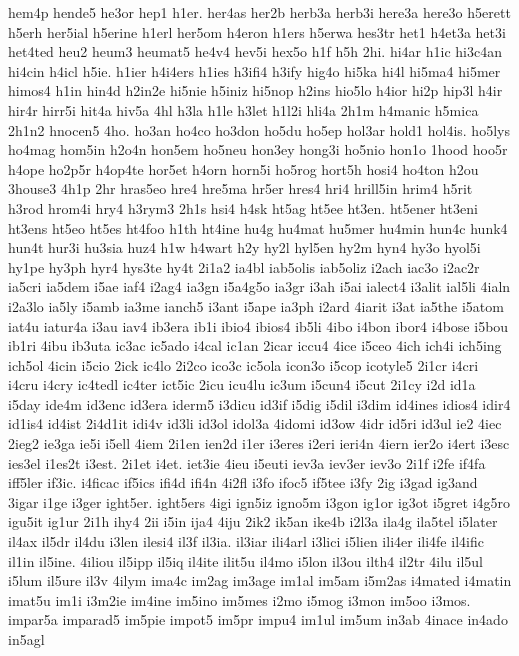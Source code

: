 {hem4p
hende5
he3or
hep1
h1er.
her4as
her2b
herb3a
herb3i
here3a
here3o
h5erett
h5erh
her5ial
h5erine
h1erl
her5om
h4eron
h1ers
h5erwa
hes3tr
het1
h4et3a
het3i
het4ted
heu2
heum3
heumat5
he4v4
hev5i
hex5o
h1f
h5h
2hi.
hi4ar
h1ic
hi3c4an
hi4cin
h4icl
h5ie.
h1ier
h4i4ers
h1ies
h3ifi4
h3ify
hig4o
hi5ka
hi4l
hi5ma4
hi5mer
himos4
h1in
hin4d
h2in2e
hi5nie
h5iniz
hi5nop
h2ins
hio5lo
h4ior
hi2p
hip3l
h4ir
hir4r
hirr5i
hit4a
hiv5a
4hl
h3la
h1le
h3let
h1l2i
hli4a
2h1m
h4manic
h5mica
2h1n2
hnocen5
4ho.
ho3an
ho4co
ho3don
ho5du
ho5ep
hol3ar
hold1
hol4is.
ho5lys
ho4mag
hom5in
h2o4n
hon5em
ho5neu
hon3ey
hong3i
ho5nio
hon1o
1hood
hoo5r
h4ope
ho2p5r
h4op4te
hor5et
h4orn
horn5i
ho5rog
hort5h
hosi4
ho4ton
h2ou
3house3
4h1p
2hr
hras5eo
hre4
hre5ma
hr5er
hres4
hri4
hrill5in
hrim4
h5rit
h3rod
hrom4i
hry4
h3rym3
2h1s
hsi4
h4sk
ht5ag
ht5ee
ht3en.
ht5ener
ht3eni
ht3ens
ht5eo
ht5es
ht4foo
h1th
ht4ine
hu4g
hu4mat
hu5mer
hu4min
hun4c
hunk4
hun4t
hur3i
hu3sia
huz4
h1w
h4wart
h2y
hy2l
hyl5en
hy2m
hyn4
hy3o
hyol5i
hy1pe
hy3ph
hyr4
hys3te
hy4t
2i1a2
ia4bl
iab5olis
iab5oliz
i2ach
iac3o
i2ac2r
ia5cri
ia5dem
i5ae
iaf4
i2ag4
ia3gn
i5a4g5o
ia3gr
i3ah
i5ai
ialect4
i3alit
ial5li
4ialn
i2a3lo
ia5ly
i5amb
ia3me
ianch5
i3ant
i5ape
ia3ph
i2ard
4iarit
i3at
ia5the
i5atom
iat4u
iatur4a
i3au
iav4
ib3era
ib1i
ibio4
ibios4
ib5li
4ibo
i4bon
ibor4
i4bose
i5bou
ib1ri
4ibu
ib3uta
ic3ac
ic5ado
i4cal
ic1an
2icar
iccu4
4ice
i5ceo
4ich
ich4i
ich5ing
ich5ol
4icin
i5cio
2ick
ic4lo
2i2co
ico3c
ic5ola
icon3o
i5cop
icotyle5
2i1cr
i4cri
i4cru
i4cry
ic4tedl
ic4ter
ict5ic
2icu
icu4lu
ic3um
i5cun4
i5cut
2i1cy
i2d
id1a
i5day
ide4m
id3enc
id3era
iderm5
i3dicu
id3if
i5dig
i5dil
i3dim
id4ines
idios4
idir4
id1is4
id4ist
2i4d1it
idi4v
id3li
id3ol
idol3a
4idomi
id3ow
4idr
id5ri
id3ul
ie2
4iec
2ieg2
ie3ga
ie5i
i5ell
4iem
2i1en
ien2d
i1er
i3eres
i2eri
ieri4n
4iern
ier2o
i4ert
i3esc
ies3el
i1es2t
i3est.
2i1et
i4et.
iet3ie
4ieu
i5euti
iev3a
iev3er
iev3o
2i1f
i2fe
if4fa
iff5ler
if3ic.
i4ficac
if5ics
ifi4d
ifi4n
4i2fl
i3fo
ifoc5
if5tee
i3fy
2ig
i3gad
ig3and
3igar
i1ge
i3ger
ight5er.
ight5ers
4igi
ign5iz
igno5m
i3gon
ig1or
ig3ot
i5gret
i4g5ro
igu5it
ig1ur
2i1h
ihy4
2ii
i5in
ija4
4iju
2ik2
ik5an
ike4b
i2l3a
ila4g
ila5tel
i5later
il4ax
il5dr
il4du
i3len
ilesi4
il3f
il3ia.
il3iar
ili4arl
i3lici
i5lien
ili4er
ili4fe
il4ific
il1in
il5ine.
4iliou
il5ipp
il5iq
il4ite
ilit5u
il4mo
i5lon
il3ou
ilth4
il2tr
4ilu
il5ul
i5lum
il5ure
il3v
4ilym
ima4c
im2ag
im3age
im1al
im5am
i5m2as
i4mated
i4matin
imat5u
im1i
i3m2ie
im4ine
im5ino
im5mes
i2mo
i5mog
i3mon
im5oo
i3mos.
impar5a
imparad5
im5pie
impot5
im5pr
impu4
im1ul
im5um
in3ab
4inace
in4ado
in5agl
}
